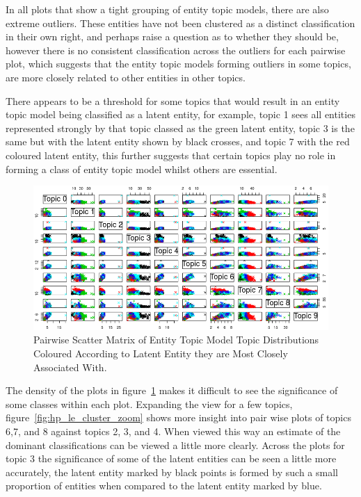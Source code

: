 \documentclass[10pt]{report}
\begin{document}
In all plots that show a tight grouping of entity topic models, there are also extreme outliers. These entities have not been clustered as a distinct classification in their own right, and perhaps raise a question as to whether they should be, however there is no consistent classification across the outliers for each pairwise plot, which suggests that the entity topic models forming outliers in some topics, are more closely related to other entities in other topics.

There appears to be a threshold for some topics that would result in an entity topic model being classified as a latent entity, for example, topic 1 sees all entities represented strongly by that topic classed as the green latent entity, topic 3 is the same but with the latent entity shown by black crosses, and topic 7 with the red coloured latent entity, this further suggests that certain topics play no role in forming a class of entity topic model whilst others are essential.

\clearpage
\renewcommand{\baselinestretch}{1.0}\normalsize
\renewcommand{\arraystretch}{1.0}
\begin{figure}[h!]
  \centering
  \includegraphics[angle=-90, scale=0.8]{hp_full_le_clusters}
\caption{ Pairwise Scatter Matrix of Entity Topic Model Topic Distributions Coloured According to Latent Entity they are Most Closely Associated With.\label{fig:hp_le_clusters}}
\end{figure}
\renewcommand{\baselinestretch}{2.0}\normalsize
\renewcommand{\arraystretch}{1.0}

\clearpage
The density of the plots in figure~\ref{fig:hp_le_clusters} makes it difficult to see the significance of some classes within each plot. Expanding the view for a few topics, figure~\ref{fig:hp_le_cluster_zoom} shows more insight into pair wise plots of topics 6,7, and 8 against topics 2, 3, and 4. When viewed this way an estimate of the dominant classifications can be viewed a little more clearly. Across the plots for topic 3 the significance of some of the latent entities can be seen a little more accurately, the latent entity marked by black points is formed by such a small proportion of entities when compared to the latent entity marked by blue.
\end{document}
